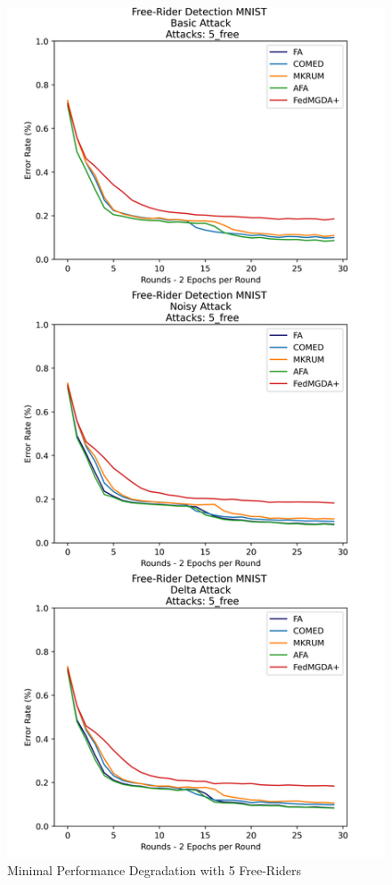 \begin{figure}[htbp]
	\centering
    \includegraphics[scale=0.1]{free_riders/graphs/no_dmg.png}
	\caption{Minimal Performance Degradation with 5 Free-Riders}
	\label{fig:no_dmg}
\end{figure}

